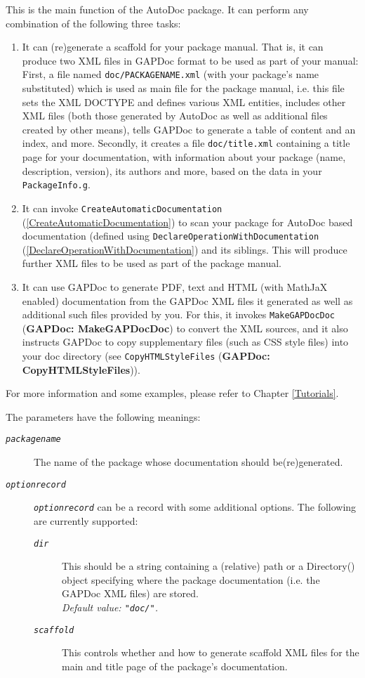\documentclass[a4paper,11pt]{report}
\begin{document}
{{{ This is the main function of the \textsf{AutoDoc} package. It can perform any combination of the following three tasks: 
\begin{enumerate}
\item  It can (re)generate a scaffold for your package manual. That is, it can
produce two XML files in \textsf{GAPDoc} format to be used as part of your manual: First, a file named \texttt{doc/PACKAGENAME.xml} (with your package's name substituted) which is used as main file for the
package manual, i.e. this file sets the XML DOCTYPE and defines various XML
entities, includes other XML files (both those generated by \textsf{AutoDoc} as well as additional files created by other means), tells \textsf{GAPDoc} to generate a table of content and an index, and more. Secondly, it creates a
file \texttt{doc/title.xml} containing a title page for your documentation, with information about your
package (name, description, version), its authors and more, based on the data
in your \texttt{PackageInfo.g}. 
\item  It can invoke \texttt{CreateAutomaticDocumentation} (\ref{CreateAutomaticDocumentation}) to scan your package for \textsf{AutoDoc} based documentation (defined using \texttt{DeclareOperationWithDocumentation} (\ref{DeclareOperationWithDocumentation}) and its siblings. This will produce further XML files to be used as part of
the package manual. 
\item  It can use \textsf{GAPDoc} to generate PDF, text and HTML (with MathJaX enabled) documentation from the \textsf{GAPDoc} XML files it generated as well as additional such files provided by you. For
this, it invokes \texttt{MakeGAPDocDoc} (\textbf{GAPDoc: MakeGAPDocDoc}) to convert the XML sources, and it also instructs \textsf{GAPDoc} to copy supplementary files (such as CSS style files) into your doc directory
(see \texttt{CopyHTMLStyleFiles} (\textbf{GAPDoc: CopyHTMLStyleFiles})). 
\end{enumerate}
 For more information and some examples, please refer to Chapter \ref{Tutorials}. 

 The parameters have the following meanings: 
\begin{description}
\item[{\mbox{\texttt{\mdseries\slshape package{\textunderscore}name}}}]  The name of the package whose documentation should be(re)generated. 
\item[{\mbox{\texttt{\mdseries\slshape option{\textunderscore}record}}}]  \mbox{\texttt{\mdseries\slshape option{\textunderscore}record}} can be a record with some additional options. The following are currently
supported: 
\begin{description}
\item[{\mbox{\texttt{\mdseries\slshape dir}}}]  This should be a string containing a (relative) path or a Directory() object
specifying where the package documentation (i.e. the \textsf{GAPDoc} XML files) are stored. \\
 \emph{Default value: \texttt{"doc/"}.} 
\item[{\mbox{\texttt{\mdseries\slshape scaffold}}}]  This controls whether and how to generate scaffold XML files for the main and
title page of the package's documentation. 


\end{description}
\end{description}}}}
\end{document}
